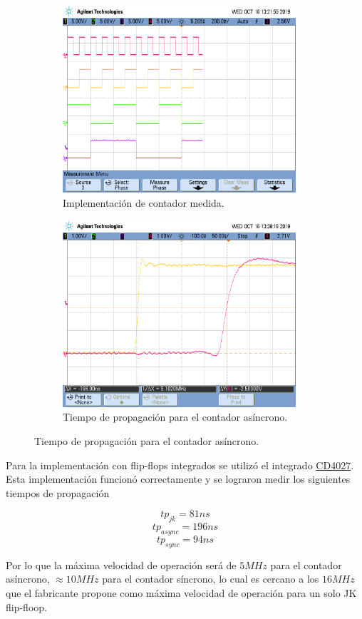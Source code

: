 \begin{figure}[H]
\begin{subfigure}{0.49\textwidth}
	\centering
	\includegraphics[width=0.95\textwidth,trim={0 2.2cm 0.1cm 1.75cm},clip]{Imagenes/counter.png}
	\caption{Implementación de contador medida.}
	\label{counterr}
\end{subfigure}
\begin{subfigure}{0.49\textwidth}
	\centering
	\includegraphics[width=0.95\textwidth,trim={0 2.2cm 0.1cm 1.75cm},clip]{Imagenes/counter1.png}
	\caption{Tiempo de propagación para el contador asíncrono.}
	\label{countersadr}
\end{subfigure}
\end{figure}

Para la implementación con flip-flops integrados se utilizó el integrado \href{http://www.sycelectronica.com.ar/semiconductores/CD4027.pdf}{CD4027}. Esta implementación funcionó correctamente y se lograron medir los siguientes tiempos de propagación

$$tp_{jk}=81ns$$
$$tp_{async}=196ns$$
$$tp_{sync}=94ns$$

Por lo que la máxima velocidad de operación será de $5MHz$ para el contador asíncrono, $\approx 10 MHz$ para el contador síncrono, lo cual es cercano a los $16MHz$ que el fabricante propone como máxima velocidad de operación para un solo JK flip-floop.

